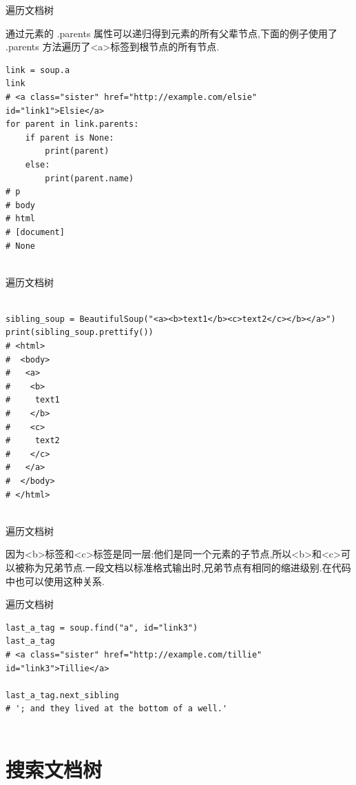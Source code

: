 \documentclass{beamer}
\begin{document}
\begin{frame}[t,fragile]{遍历文档树}

通过元素的 .parents 属性可以递归得到元素的所有父辈节点,下面的例子使用了 .parents 方法遍历了<a>标签到根节点的所有节点.

\begin{verbatim}
link = soup.a
link
# <a class="sister" href="http://example.com/elsie" id="link1">Elsie</a>
for parent in link.parents:
    if parent is None:
        print(parent)
    else:
        print(parent.name)
# p
# body
# html
# [document]
# None


\end{verbatim}


\end{frame}


\begin{frame}[t,fragile]{遍历文档树}


\begin{verbatim}

sibling_soup = BeautifulSoup("<a><b>text1</b><c>text2</c></b></a>")
print(sibling_soup.prettify())
# <html>
#  <body>
#   <a>
#    <b>
#     text1
#    </b>
#    <c>
#     text2
#    </c>
#   </a>
#  </body>
# </html>


\end{verbatim}


\end{frame}


\begin{frame}[t]{遍历文档树}

因为<b>标签和<c>标签是同一层:他们是同一个元素的子节点,所以<b>和<c>可以被称为兄弟节点.一段文档以标准格式输出时,兄弟节点有相同的缩进级别.在代码中也可以使用这种关系.

\end{frame}

\begin{frame}[t,fragile]{遍历文档树}

\begin{verbatim}
last_a_tag = soup.find("a", id="link3")
last_a_tag
# <a class="sister" href="http://example.com/tillie" id="link3">Tillie</a>

last_a_tag.next_sibling
# '; and they lived at the bottom of a well.'


\end{verbatim}


\end{frame}

\section{搜索文档树}
\end{document}
